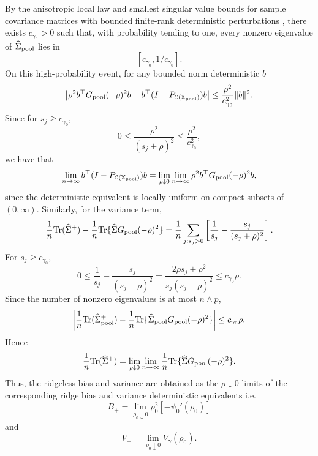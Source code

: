 \documentclass{article}
\theoremstyle{plain}
\theoremstyle{remark}
\def \Xm {\mathbb{X}_{\rm pool}}
\def \tr {\mathrm{Tr}}
\begin{document}


By the anisotropic local law \citep{knowles2017anisotropic} and smallest singular value bounds for sample covariance matrices with bounded finite-rank deterministic perturbations \citep{bai2010spectral}, there exists \(c_{\gamma_0}>0\) such that, with probability tending to one, every nonzero eigenvalue of \(\widehat\Sigma_{\rm pool}\) lies in
\[
[c_{\gamma_0},1/c_{\gamma_0}].
\]
On this high-probability event, for any bounded norm deterministic \(b\)
\[
\left|
\rho^2 b^\top G_{\rm pool}(-\rho)^2b
-
b^\top(I-P_{\mathcal{C}(\Xm)})b
\right|
\le
\frac{\rho^2}{c_{\gamma_0}^2}\|b\|^2.
\]
Since for \(s_j\ge c_{\gamma_0}\),
\[
0\le
\frac{\rho^2}{(s_j+\rho)^2}
\le
\frac{\rho^2}{c_{\gamma_0}^2},
\]
we have that
\[
\lim_{n\to\infty}b^\top(I-P_{\mathcal{C}(\Xm)})b
=
\lim_{\rho\downarrow0}\lim_{n\to\infty}
\rho^2 b^\top G_{\rm pool}(-\rho)^2b,
\]
since the deterministic equivalent is locally uniform on compact subsets of $(0,\infty)$.
Similarly, for the variance term,
\[
\frac1n\tr(\widehat\Sigma^+)
-
\frac1n\tr\{\widehat\Sigma G_{\rm pool}(-\rho)^2\}
=
\frac1n\sum_{j:s_j>0}
\left[
\frac1{s_j}
-
\frac{s_j}{(s_j+\rho)^2}
\right].
\]
For \(s_j\ge c_{\gamma_0}\),
\[
0\le
\frac1{s_j}
-
\frac{s_j}{(s_j+\rho)^2}
=
\frac{2\rho s_j+\rho^2}{s_j(s_j+\rho)^2}
\le
c_{\gamma_0}\rho.
\]
Since the number of nonzero eigenvalues is at most \(n\wedge p\),
\[
\left|
\frac1n\tr(\widehat\Sigma_{\rm pool}^+)
-
\frac1n\tr\{\widehat\Sigma_{\rm pool} G_{\rm pool}(-\rho)^2\}
\right|
\le
c_{\gamma_0}\rho.
\]
Hence
\[
\frac1n\tr(\widehat\Sigma^+)
=
\lim_{\rho\downarrow0}\lim_{n\to\infty}
\frac1n\tr\{\widehat\Sigma G_{\rm pool}(-\rho)^2\}.
\]
Thus, the ridgeless bias and variance are obtained as the \(\rho\downarrow0\) limits of the corresponding ridge bias and variance deterministic equivalents i.e. 
\[
B_+
=
\lim_{\rho_0\downarrow0}
\rho_0^2[-\psi_0'(\rho_0)]
\]
 and 
\[
V_+
=
\lim_{\rho_0\downarrow0}
V_\gamma(\rho_0).
\]
\end{document}
